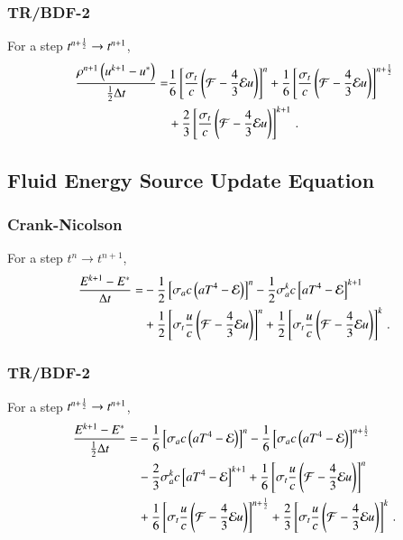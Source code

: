 \documentclass[preprint,12pt]{elsarticle}
\begin{document}
\subsubsection{TR/BDF-2}
For a step $t^{n+\frac{1}{2}}\rightarrow t^{n+1}$,
\begin{equation}\begin{split}
  \frac{\rho^{n+1}\left(u^{k+1}-u^*\right)}{\frac{1}{2}\Delta t} =  
  & \frac{1}{6}\left[\frac{\sigma_{t}}{c}\left(\mathcal{F}-\frac{4}{3}\mathcal{E} u\right)\right]^n
   +\frac{1}{6}\left[\frac{\sigma_{t}}{c}\left(\mathcal{F}-\frac{4}{3}\mathcal{E} u\right)\right]^{n+\frac{1}{2}}\\
  &+\frac{2}{3}\left[\frac{\sigma_{t}}{c}\left(\mathcal{F}-\frac{4}{3}\mathcal{E} u\right)\right]^{k+1}
  \, .
\end{split}\end{equation}

\subsection{Fluid Energy Source Update Equation}
\subsubsection{Crank-Nicolson}
For a step $t^n\rightarrow t^{n+1}$,
\begin{equation}\begin{split}
  \frac{E^{k+1}-E^*}{\Delta t} = &
  -\frac{1}{2}\left[\sigma_{a} c\left(aT^4 - \mathcal{E}\right)\right]^n
  -\frac{1}{2}\sigma_{a}^k c\left[aT^4 - \mathcal{E}\right]^{k+1}\\
  &+\frac{1}{2}\left[\sigma_{t}\frac{u}{c}\left(\mathcal{F}-\frac{4}{3}\mathcal{E} u\right)\right]^n
   +\frac{1}{2}\left[\sigma_t\frac{u}{c}\left(\mathcal{F}-\frac{4}{3}\mathcal{E} u\right)\right]^k
  \, .
\end{split}\end{equation}

\subsubsection{TR/BDF-2}
For a step $t^{n+\frac{1}{2}}\rightarrow t^{n+1}$,
\begin{equation}\begin{split}
  \frac{E^{k+1}-E^*}{\frac{1}{2}\Delta t} = &
  -\frac{1}{6}\left[\sigma_a c\left(aT^4 - \mathcal{E}\right)\right]^n
  -\frac{1}{6}\left[\sigma_a c\left(aT^4 - \mathcal{E}\right)\right]^{n+\frac{1}{2}}\\
  &-\frac{2}{3}\sigma_a^k c\left[aT^4 - \mathcal{E}\right]^{k+1}
   +\frac{1}{6}\left[\sigma_t\frac{u}{c}\left(\mathcal{F}-\frac{4}{3}\mathcal{E} u\right)\right]^n\\
  &+\frac{1}{6}\left[\sigma_t\frac{u}{c}\left(\mathcal{F}-\frac{4}{3}\mathcal{E} u\right)\right]^{n+\frac{1}{2}}
   +\frac{2}{3}\left[\sigma_t\frac{u}{c}\left(\mathcal{F}-\frac{4}{3}\mathcal{E} u\right)\right]^k
  \, .
\end{split}\end{equation}
\end{document}
